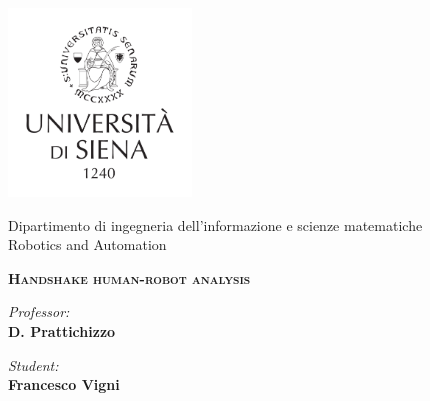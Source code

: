 \thispagestyle{empty}
\begin{center}
\includegraphics[height=5cm]{Figure/LOGO_UNISI.pdf}

\large{ \sc Dipartimento di ingegneria dell'informazione e scienze matematiche}
\vspace{0.5cm
\large Computer and Automation Engineering}\\
\vspace{0.5cm}
\large {\sc Robotics and Automation}
\vspace{1cm}
 

\textbf{\scshape{\LARGE{Handshake human-robot analysis\\}}}

\end{center}

\noindent\begin{minipage}[b]{0.47\textwidth}
\large
\emph{Professor:}\\
\textbf{D. Prattichizzo}  
\end{minipage}
\hfill
\begin{minipage}[b]{0.47\textwidth}\raggedleft
 \large
\emph{Student:}\\
\textbf{Francesco Vigni}\\


\end{minipage}

